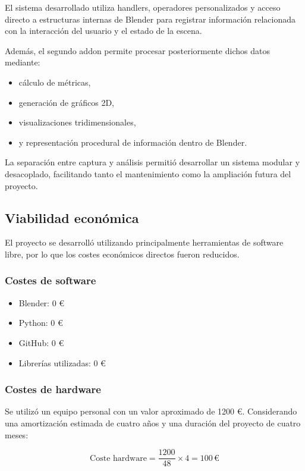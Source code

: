 El sistema desarrollado utiliza handlers, operadores personalizados y acceso directo a estructuras internas de Blender para registrar información relacionada con la interacción del usuario y el estado de la escena.

Además, el segundo addon permite procesar posteriormente dichos datos mediante:

\begin{itemize}
    \item cálculo de métricas,
    \item generación de gráficos 2D,
    \item visualizaciones tridimensionales,
    \item y representación procedural de información dentro de Blender.
\end{itemize}

La separación entre captura y análisis permitió desarrollar un sistema modular y desacoplado, facilitando tanto el mantenimiento como la ampliación futura del proyecto.

\subsection{Viabilidad económica}

El proyecto se desarrolló utilizando principalmente herramientas de software libre, por lo que los costes económicos directos fueron reducidos.

\subsubsection{Costes de software}

\begin{itemize}
    \item Blender: 0 €
    \item Python: 0 €
    \item GitHub: 0 €
    \item Librerías utilizadas: 0 €
\end{itemize}

\subsubsection{Costes de hardware}

Se utilizó un equipo personal con un valor aproximado de 1200 €. Considerando una amortización estimada de cuatro años y una duración del proyecto de cuatro meses:

\[
\text{Coste hardware} = \frac{1200}{48} \times 4 = 100 \,€
\]

